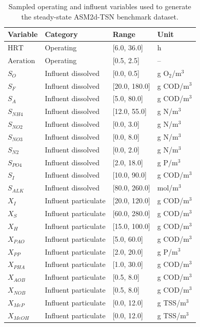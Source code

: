 \documentclass[a4paper,fleqn]{cas-sc}
\begin{document}
\begin{table}[htbp]
\centering
\caption{Sampled operating and influent variables used to generate the steady-state ASM2d-TSN benchmark dataset.}
\label{tab:simulation_domain}
\scriptsize
\setlength{\tabcolsep}{3pt}
\begin{tabular}{p{2.1cm}p{2.7cm}p{2.8cm}p{3.0cm}}
\hline
Variable & Category & Range & Unit \\
\hline
$\mathrm{HRT}$ & Operating & [6.0, 36.0] & h \\
$\mathrm{Aeration}$ & Operating & [0.5, 2.5] & -- \\
$S_O$ & Influent dissolved & [0.0, 0.5] & g O$_2$/m$^3$ \\
$S_F$ & Influent dissolved & [20.0, 180.0] & g COD/m$^3$ \\
$S_A$ & Influent dissolved & [5.0, 80.0] & g COD/m$^3$ \\
$S_{NH4}$ & Influent dissolved & [12.0, 55.0] & g N/m$^3$ \\
$S_{NO2}$ & Influent dissolved & [0.0, 3.0] & g N/m$^3$ \\
$S_{NO3}$ & Influent dissolved & [0.0, 8.0] & g N/m$^3$ \\
$S_{N2}$ & Influent dissolved & [0.0, 2.0] & g N/m$^3$ \\
$S_{PO4}$ & Influent dissolved & [2.0, 18.0] & g P/m$^3$ \\
$S_I$ & Influent dissolved & [10.0, 90.0] & g COD/m$^3$ \\
$S_{ALK}$ & Influent dissolved & [80.0, 260.0] & mol/m$^3$ \\
$X_I$ & Influent particulate & [20.0, 120.0] & g COD/m$^3$ \\
$X_S$ & Influent particulate & [60.0, 280.0] & g COD/m$^3$ \\
$X_H$ & Influent particulate & [15.0, 100.0] & g COD/m$^3$ \\
$X_{PAO}$ & Influent particulate & [5.0, 60.0] & g COD/m$^3$ \\
$X_{PP}$ & Influent particulate & [2.0, 20.0] & g P/m$^3$ \\
$X_{PHA}$ & Influent particulate & [1.0, 30.0] & g COD/m$^3$ \\
$X_{AOB}$ & Influent particulate & [0.5, 8.0] & g COD/m$^3$ \\
$X_{NOB}$ & Influent particulate & [0.5, 8.0] & g COD/m$^3$ \\
$X_{MeP}$ & Influent particulate & [0.0, 12.0] & g TSS/m$^3$ \\
$X_{MeOH}$ & Influent particulate & [0.0, 12.0] & g TSS/m$^3$ \\
\hline
\end{tabular}
\end{table}
\end{document}
